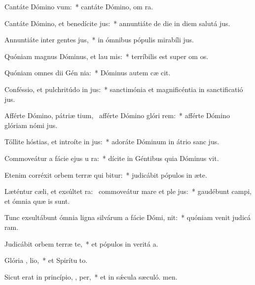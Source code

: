 \item Cantáte Dómino  vum:~* cantáte Dómino, om ra.
\item Cantáte Dómino, et benedícite  jus:~* annuntiáte de die in diem salutá jus.
\item Annuntiáte inter gentes  jus,~* in ómnibus pópulis mirabíli jus.
\item Quóniam magnus Dóminus, et lau mis:~* terríbilis est super om os.
\item Quóniam omnes dii Gén nia:~* Dóminus autem cæ cit.
\item Conféssio, et pulchritúdo in  jus:~* sanctimónia et magnificéntia in sanctificatió jus.
\item Afférte Dómino, pátriæ tium,~\pscross{} afférte Dómino glóri  rem:~* afférte Dómino glóriam nómi jus.
\item Tóllite hóstias, et introíte in  jus:~* adoráte Dóminum in átrio sanc jus.
\item Commoveátur a fácie ejus u ra:~* dícite in Géntibus quia Dóminus vit.
\item Etenim corréxit orbem terræ qui  bitur:~* judicábit pópulos in æte.
\item Læténtur cæli, et exsúltet ra:~\pscross{} commoveátur mare et ple jus:~* gaudébunt campi, et ómnia quæ  is sunt.
\item Tunc exsultábunt ómnia ligna silvárum a fácie Dómi,  nit:~* quóniam venit judicá ram.
\item Judicábit orbem terræ  te,~* et pópulos in veritá a.
\item Glória ,  lio,~* et Spirítu to.
\item Sicut erat in princípio,  ,  per,~* et in sǽcula sæculó. men.
